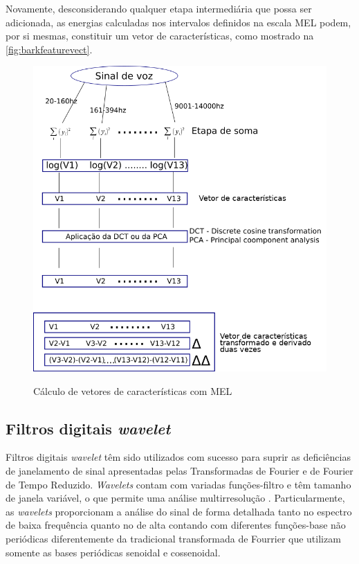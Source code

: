 			\par Novamente, desconsiderando qualquer etapa intermediária que possa ser adicionada, as energias calculadas nos intervalos definidos na escala MEL podem, por si mesmas, constituir um vetor de características, como mostrado na  \autoref{fig:barkfeaturevect}.
			
			\begin{figure}[h]
				\centering
				\caption{Cálculo de vetores de características com MEL}
				\includegraphics[width=0.8\linewidth]{images/melFeatureVect}
				\label{fig:melfeaturevect}
			\end{figure}
	
		\subsection{Filtros digitais \textit{wavelet}}
			\par Filtros digitais \textit{wavelet} têm sido utilizados com sucesso para suprir as deficiências de janelamento de sinal apresentadas pelas Transformadas de Fourier e de Fourier de Tempo Reduzido. \textit{Wavelets} contam com variadas funções-filtro e têm tamanho de janela variável, o que permite uma análise multirresolução \cite{Rod5254905}. Particularmente, as \textit{wavelets} proporcionam a análise do sinal de forma detalhada tanto no espectro de baixa frequência quanto no de alta contando com diferentes funções-base não periódicas diferentemente da tradicional transformada de Fourrier que utilizam somente as bases periódicas senoidal e cossenoidal.
			
